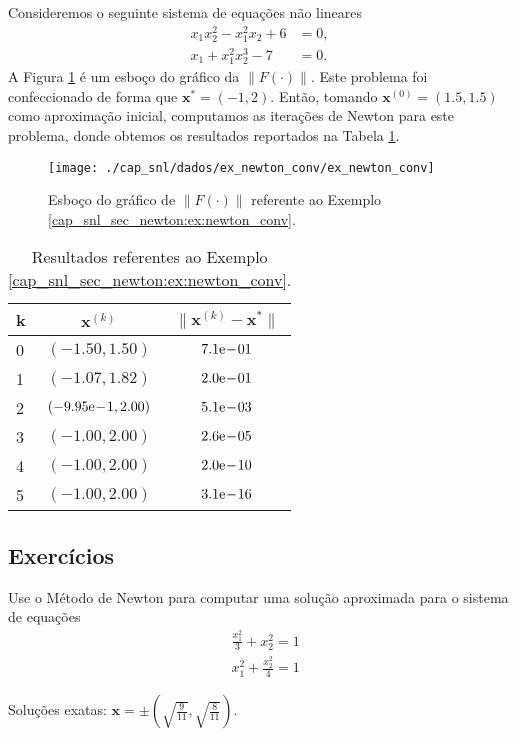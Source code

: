 \begin{ex}\label{cap_snl_sec_newton:ex:newton_conv}
  Consideremos o seguinte sistema de equações não lineares
  \begin{align}
    x_1x_2^2 - x_1^2x_2 + 6 &= 0,\\
    x_1 + x_1^2x_2^3 - 7 &= 0.
  \end{align}
  A Figura \ref{cap_snl_sec_newton:fig:ex_newton_conv} é um esboço do gráfico da $\|F(\cdot)\|$. Este problema foi confeccionado de forma que $\pmb{x}^* = (-1, 2)$. Então, tomando $\pmb{x}^{(0)} = (1.5, 1.5)$ como aproximação inicial, computamos as iterações de Newton para este problema, donde obtemos os resultados reportados na Tabela \ref{cap_snl_sec_newton:tab:ex_newton_conv}. 

  \begin{figure}[h!]
    \centering
    \texttt{[image: ./cap\_snl/dados/ex\_newton\_conv/ex\_newton\_conv]}
    \caption{Esboço do gráfico de $\|F(\cdot)\|$ referente ao Exemplo \ref{cap_snl_sec_newton:ex:newton_conv}.}
    \label{cap_snl_sec_newton:fig:ex_newton_conv}
  \end{figure}

  \begin{table}[H]
    \centering
    \begin{tabular}{lcc}
      k & $\pmb{x}^{(k)}$ & $\|\pmb{x}^{(k)} - \pmb{x}^*\|$\\\hline
      0 & $(-1.50, 1.50)$ & $7.1\mathrm{e}\!-\!01$\\
      1 & $(-1.07, 1.82)$ & $2.0\mathrm{e}\!-\!01$\\
      2 & $(-9.95\mathrm{e}\!-\!1, 2.00)$ & $5.1\mathrm{e}\!-\!03$\\
      3 & $(-1.00, 2.00)$ & $2.6\mathrm{e}\!-\!05$ \\
      4 & $(-1.00, 2.00)$ & $2.0\mathrm{e}\!-\!10$ \\
      5 & $(-1.00, 2.00)$ & $3.1\mathrm{e}\!-\!16$ \\\hline
    \end{tabular}
    \caption{Resultados referentes ao Exemplo \ref{cap_snl_sec_newton:ex:newton_conv}.}
    \label{cap_snl_sec_newton:tab:ex_newton_conv}
  \end{table}
\end{ex}

\subsection{Exercícios}

\begin{exer}
  Use o Método de Newton para computar uma solução aproximada para o sistema de equações
  \begin{subequations}
    \begin{align}
      & \frac{x_1^2}{3} + x_2^2 = 1\\
      & x_1^2 + \frac{x_2^2}{4} = 1
    \end{align}
  \end{subequations}
\end{exer}
\begin{resp}
  Soluções exatas: $\pmb{x} = \pm\left(\sqrt{\frac{9}{11}}, \sqrt{\frac{8}{11}}\right)$.
\end{resp}

